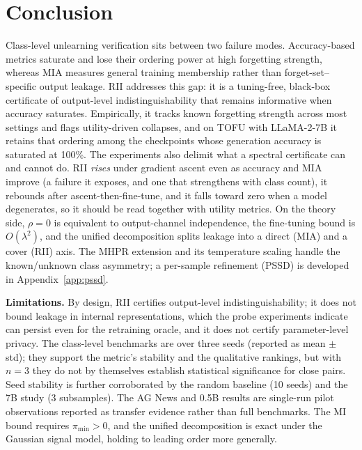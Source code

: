 \documentclass[smallextended]{svjour3}       %
\begin{document}
\section{Conclusion}
\label{sec:conclusion}

Class-level unlearning verification sits between two failure modes. Accuracy-based metrics saturate and lose their ordering power at high forgetting strength, whereas MIA measures general training membership rather than forget-set--specific output leakage. RII addresses this gap: it is a tuning-free, black-box certificate of output-level indistinguishability that remains informative when accuracy saturates. Empirically, it tracks known forgetting strength across most settings and flags utility-driven collapses, and on TOFU with LLaMA-2-7B it retains that ordering among the checkpoints whose generation accuracy is saturated at 100\%. The experiments also delimit what a spectral certificate can and cannot do. RII \emph{rises} under gradient ascent even as accuracy and MIA improve (a failure it exposes, and one that strengthens with class count), it rebounds after ascent-then-fine-tune, and it falls toward zero when a model degenerates, so it should be read together with utility metrics. On the theory side, $\rho=0$ is equivalent to output-channel independence, the fine-tuning bound is $O(\lambda^2)$, and the unified decomposition splits leakage into a direct (MIA) and a cover (RII) axis. The MHPR extension and its temperature scaling handle the known/unknown class asymmetry; a per-sample refinement (PSSD) is developed in Appendix~\ref{app:pssd}.

\textbf{Limitations.} By design, RII certifies output-level indistinguishability; it does not bound leakage in internal representations, which the probe experiments indicate can persist even for the retraining oracle, and it does not certify parameter-level privacy. The class-level benchmarks are over three seeds (reported as mean $\pm$ std); they support the metric's stability and the qualitative rankings, but with $n{=}3$ they do not by themselves establish statistical significance for close pairs. Seed stability is further corroborated by the random baseline (10 seeds) and the 7B study (3 subsamples). The AG News and 0.5B results are single-run pilot observations reported as transfer evidence rather than full benchmarks. The MI bound requires $\pi_{\min}>0$, and the unified decomposition is exact under the Gaussian signal model, holding to leading order more generally.
\end{document}
